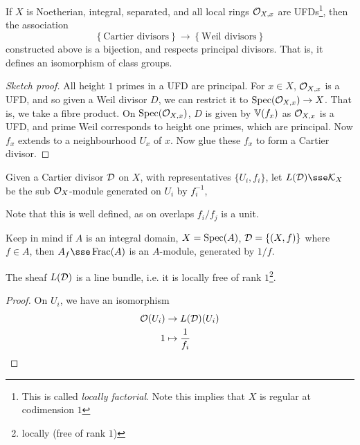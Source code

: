 \documentclass{article}
\begin{document}
\begin{proposition}
    If \(X\) is Noetherian, integral, separated, and all local rings \(\mathcal{O}_{X, x}\) are UFDs\footnote{This is called \emph{locally factorial}. Note this implies that \(X\) is regular at codimension \(1\)}, then the association
    \[\left\{\text{Cartier divisors}\right\} \to \left\{\text{Weil divisors}\right\}\]
    constructed above is a bijection, and respects principal divisors. That is, it defines an isomorphism of class groups.
\end{proposition}

\begin{proof}
    [Sketch proof] All height \(1\) primes in a UFD are principal. For \(x \in X\), \(\mathcal{O}_{X, x}\) is a UFD, and so given a Weil divisor \(D\), we can restrict it to \(\operatorname{Spec}(\mathcal{O}_{X, x}) \to X\). That is, we take a fibre product. On \(\operatorname{Spec}(\mathcal{O}_{X, x})\), \(D\) is given by \(\mathbb{V}(f_x)\) as \(\mathcal{O}_{X, x}\) is a UFD, and prime Weil corresponds to height one primes, which are principal. Now \(f_x\) extends to a neighbourhood \(U_x\) of \(x\). Now glue these \(f_x\) to form a Cartier divisor.
\end{proof}

\begin{definition}
    Given a Cartier divisor \(\mathcal{D}\) on \(X\), with representatives \(\{U_i, f_i\}\), let
    \(L(\mcD) \sse \mcK_X\) be the sub \(\mathcal{O}_X\)-module generated on \(U_i\) by \(f_i^{-1}\),
\end{definition}

\begin{addendum}
    Note that this is well defined, as on overlaps \(f_i/f_j\) is a unit.
\end{addendum}

Keep in mind if \(A\) is an integral domain, \(X = \operatorname{Spec}(A)\), \(\mathcal{D} = \{(X, f)\}\) where \(f \in A\), then \(A_f \sse \Frac(A)\) is an \(A\)-module, generated by \(1/f\).

\begin{proposition}
    The sheaf \(L(\mathcal{D})\) is a line bundle, i.e. it is locally free of rank \(1\)\footnote{locally (free of rank \(1\))}.
\end{proposition}

\begin{proof}
    On \(U_i\), we have an isomorphism
    \begin{align*}
        \mathcal{O}(U_i) &\to L(\mathcal{D})(U_i) \\
        1 &\mapsto \frac{1}{f_i}
    \end{align*}
\end{proof}
\end{document}
